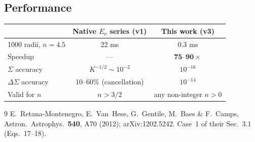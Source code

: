 \documentclass{article}
\begin{document}
\subsection{Performance}
\begin{center}
\begin{tabular}{lcc}
\toprule
& Native $E_\nu$ series (v1) & This work (v3)\\
\midrule
1000 radii, $n=4.5$ & 22 ms & 0.3 ms\\
Speedup & --- & $\mathbf{75\text{--}90\times}$\\
$\Sigma$ accuracy & $K^{-1/2}\sim10^{-2}$ & $10^{-16}$\\
$\Delta\Sigma$ accuracy & 10--60\% (cancellation) & $10^{-14}$\\
Valid for $n$ & $n>3/2$ & any non-integer $n>0$\\
\bottomrule
\end{tabular}
\end{center}

\begin{thebibliography}{9}
E.~Retana-Montenegro, E.~Van~Hese, G.~Gentile, M.~Baes \& F.~Camps,
Astron.\ Astrophys.\ \textbf{540}, A70 (2012); arXiv:1202.5242.
Case~1 of their Sec.~3.1 (Eqs.~17--18).
\end{thebibliography}
\end{document}
